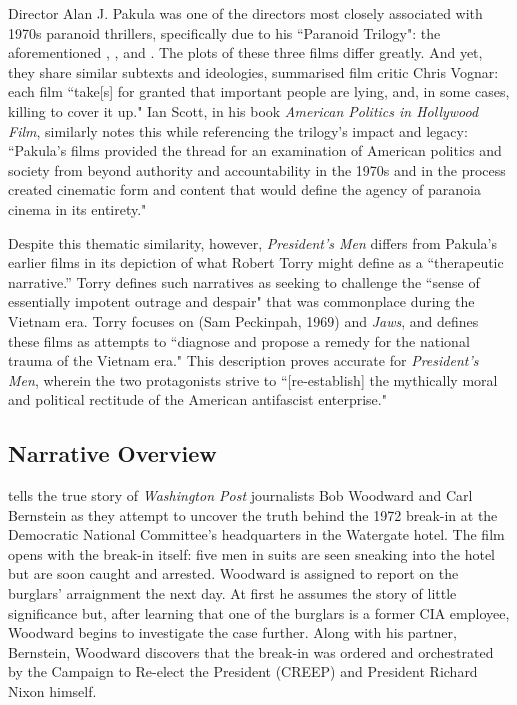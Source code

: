 Director Alan J. Pakula was one of the directors most closely associated with 1970s paranoid thrillers, specifically due to his ``Paranoid Trilogy": the aforementioned , , and .
The plots of these three films differ greatly.
And yet, they share similar subtexts and ideologies, summarised film critic Chris Vognar: each film ``take[s] for granted that important people are lying, and, in some cases, killing to cover it up."\autocites[][]{vognar_parallax_2021}
Ian Scott, in his book \textit{American Politics in Hollywood Film}, similarly notes this while referencing the trilogy's impact and legacy:
``Pakula's films provided the thread for an examination of American politics and society from beyond authority and accountability in the 1970s and in the process created cinematic form and content that would define the agency of paranoia cinema in its entirety."\autocites[][138]{scott_american_2011}

Despite this thematic similarity, however, \textit{President's Men} differs from Pakula's earlier films in its depiction of what Robert Torry might define as a ``therapeutic narrative.”
Torry defines such narratives as seeking to challenge the ``sense of essentially impotent outrage and despair" that was commonplace during the Vietnam era.\autocites[][27]{torry_therapeutic_1993}
Torry focuses on  (Sam Peckinpah, 1969) and \textit{Jaws}, and defines these films as attempts to ``diagnose and propose a remedy for the national trauma of the Vietnam era."\autocites[][27]{torry_therapeutic_1993}
This description proves accurate for \textit{President's Men}, wherein the two protagonists strive to ``[re-establish] the mythically moral and political rectitude of the American antifascist enterprise."\autocites[][34]{torry_therapeutic_1993}


\subsection{Narrative Overview}

 tells the true story of \textit{Washington Post} journalists Bob Woodward and Carl Bernstein as they attempt to uncover the truth behind the 1972 break-in at the Democratic National Committee's headquarters in the Watergate hotel.
The film opens with the break-in itself: five men in suits are seen sneaking into the hotel but are soon caught and arrested.
Woodward is assigned to report on the burglars' arraignment the next day.
At first he assumes the story of little significance but, after learning that one of the burglars is a former CIA employee, Woodward begins to investigate the case further.
Along with his partner, Bernstein, Woodward discovers that the break-in was ordered and orchestrated by the Campaign to Re-elect the President (CREEP) and President Richard Nixon himself.

